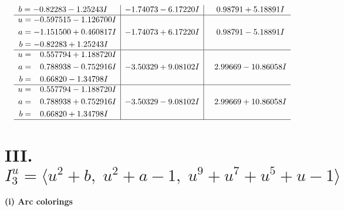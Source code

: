\documentclass[1p]{elsarticle_modified}
\theoremstyle{definition}
\begin{document}
$$\begin{array}{c|c|c}
\begin{aligned}
b &= -0.82283 - 1.25243 I\end{aligned}
 & -1.74073 - 6.17220 I & \phantom{-}0.98791 + 5.18891 I \\ \hline\begin{aligned}
u &= -0.597515 - 1.126700 I \\
a &= -1.151500 + 0.460817 I \\
b &= -0.82283 + 1.25243 I\end{aligned}
 & -1.74073 + 6.17220 I & \phantom{-}0.98791 - 5.18891 I \\ \hline\begin{aligned}
u &= \phantom{-}0.557794 + 1.188720 I \\
a &= \phantom{-}0.788938 - 0.752916 I \\
b &= \phantom{-}0.66820 - 1.34798 I\end{aligned}
 & -3.50329 + 9.08102 I & \phantom{-}2.99669 - 10.86058 I \\ \hline\begin{aligned}
u &= \phantom{-}0.557794 - 1.188720 I \\
a &= \phantom{-}0.788938 + 0.752916 I \\
b &= \phantom{-}0.66820 + 1.34798 I\end{aligned}
 & -3.50329 - 9.08102 I & \phantom{-}2.99669 + 10.86058 I\\
 \hline 
 \end{array}$$\newpage\newpage\renewcommand{\arraystretch}{1}
\centering \section*{III. $I^u_{3}= \langle u^2+b,\;u^2+a-1,\;u^9+u^7+u^5+u-1 \rangle$}
\flushleft \textbf{(i) Arc colorings}\\
\end{document}
